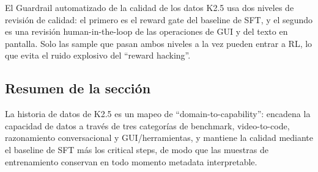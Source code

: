 \begin{importantbox}{El Guardrail automatizado de la calidad de los datos}
K2.5 usa dos niveles de revisión de calidad: el primero es el reward gate del baseline de SFT, y el segundo es una revisión human-in-the-loop de las operaciones de GUI y del texto en pantalla. Solo las sample que pasan ambos niveles a la vez pueden entrar a RL, lo que evita el ruido explosivo del ``reward hacking''.
\end{importantbox}

\subsection{Resumen de la sección}
La historia de datos de K2.5 es un mapeo de ``domain-to-capability'': encadena la capacidad de datos a través de tres categorías de benchmark, video-to-code, razonamiento conversacional y GUI/herramientas, y mantiene la calidad mediante el baseline de SFT más los critical steps, de modo que las muestras de entrenamiento conservan en todo momento metadata interpretable.
